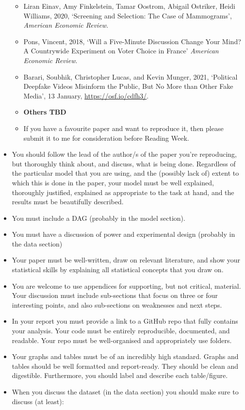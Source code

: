 \documentclass[
]{book}
\providecommand{\tightlist}{%
  \setlength{\itemsep}{0pt}\setlength{\parskip}{0pt}}
\begin{document}
\begin{itemize}
  \begin{itemize}
  \tightlist
  \item
    Liran Einav, Amy Finkelstein, Tamar Oostrom, Abigail Ostriker, Heidi Williams, 2020, `Screening and Selection: The Case of Mammograms', \emph{American Economic Review}.
  \item
    Pons, Vincent, 2018, `Will a Five-Minute Discussion Change Your Mind? A Countrywide Experiment on Voter Choice in France' \emph{American Economic Review}.
  \item
    Barari, Soubhik, Christopher Lucas, and Kevin Munger, 2021, `Political Deepfake Videos Misinform the Public, But No More than Other Fake Media', 13 January, \url{https://osf.io/cdfh3/}.
  \item
    \textbf{Others TBD}
  \item
    If you have a favourite paper and want to reproduce it, then please submit it to me for consideration before Reading Week.
  \end{itemize}
\item
  You should follow the lead of the author/s of the paper you're reproducing, but thoroughly think about, and discuss, what is being done. Regardless of the particular model that you are using, and the (possibly lack of) extent to which this is done in the paper, your model must be well explained, thoroughly justified, explained as appropriate to the task at hand, and the results must be beautifully described.
\item
  You must include a DAG (probably in the model section).
\item
  You must have a discussion of power and experimental design (probably in the data section)
\item
  Your paper must be well-written, draw on relevant literature, and show your statistical skills by explaining all statistical concepts that you draw on.
\item
  You are welcome to use appendices for supporting, but not critical, material. Your discussion must include sub-sections that focus on three or four interesting points, and also sub-sections on weaknesses and next steps.
\item
  In your report you must provide a link to a GitHub repo that fully contains your analysis. Your code must be entirely reproducible, documented, and readable. Your repo must be well-organised and appropriately use folders.
\item
  Your graphs and tables must be of an incredibly high standard. Graphs and tables should be well formatted and report-ready. They should be clean and digestible. Furthermore, you should label and describe each table/figure.
\item
  When you discuss the dataset (in the data section) you should make sure to discuss (at least):


\end{itemize}
\end{document}
